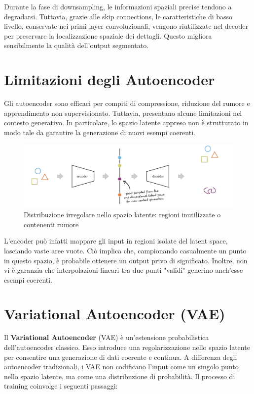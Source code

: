 Durante la fase di downsampling, le informazioni spaziali precise tendono a degradarsi. Tuttavia, grazie alle skip connections, le caratteristiche di basso livello, conservate nei primi layer convoluzionali, vengono riutilizzate nel decoder per preservare la localizzazione spaziale dei dettagli. Questo migliora sensibilmente la qualità dell'output segmentato.

\section{Limitazioni degli Autoencoder}

Gli autoencoder sono efficaci per compiti di compressione, riduzione del rumore e apprendimento non supervisionato. Tuttavia, presentano alcune limitazioni nel contesto generativo. In particolare, lo spazio latente appreso non è strutturato in modo tale da garantire la generazione di nuovi esempi coerenti.

\begin{figure}[!ht]
\centering
\includegraphics[width=\textwidth]{figure/EncLimit.png}
\caption{Distribuzione irregolare nello spazio latente: regioni inutilizzate o contenenti rumore}
\label{fig:enclimit}
\end{figure}

L’encoder può infatti mappare gli input in regioni isolate del latent space, lasciando vaste aree vuote. Ciò implica che, campionando casualmente un punto in questo spazio, è probabile ottenere un output privo di significato. Inoltre, non vi è garanzia che interpolazioni lineari tra due punti "validi" generino anch’esse esempi coerenti.

\section{Variational Autoencoder (VAE)}

Il \textbf{Variational Autoencoder} (VAE) è un’estensione probabilistica dell’autoencoder classico. Esso introduce una regolarizzazione nello spazio latente per consentire una generazione di dati coerente e continua. A differenza degli autoencoder tradizionali, i VAE non codificano l’input come un singolo punto nello spazio latente, ma come una distribuzione di probabilità. Il processo di training coinvolge i seguenti passaggi:

